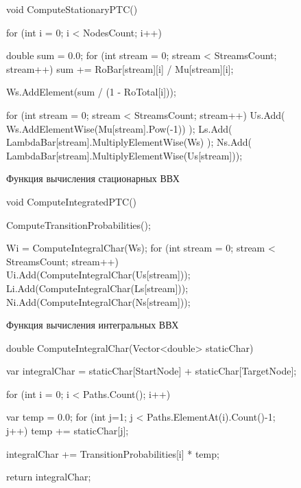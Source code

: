 \documentclass[oneside, draft, 14pt, a4paper]{extreport}
\begin{document}
\begin{figure}[h!]
	\begin{listing}{1}
void ComputeStationaryPTC()
{
  for (int i = 0; i < NodesCount; i++)
  {
	double sum = 0.0;
	for (int stream = 0; stream < StreamsCount; stream++)
	sum += RoBar[stream][i] / Mu[stream][i];

	Ws.AddElement(sum / (1 - RoTotal[i]));
  }

  for (int stream = 0; stream < StreamsCount; stream++)
  {
	Us.Add( Ws.AddElementWise(Mu[stream].Pow(-1)) );
	Ls.Add(
	  LambdaBar[stream].MultiplyElementWise(Ws) );
	Ns.Add(
	  LambdaBar[stream].MultiplyElementWise(Us[stream]));
  }
}\end{listing}

	\caption{Функция вычисления стационарных ВВХ}
	\label{pic:function_computeSPTC}
\end{figure}

\begin{figure}[h!]
	\begin{listing}{1}
void ComputeIntegratedPTC()
{
  ComputeTransitionProbabilities();

  Wi = ComputeIntegralChar(Ws);
  for (int stream = 0; stream < StreamsCount; stream++)
  {
	Ui.Add(ComputeIntegralChar(Us[stream]));
	Li.Add(ComputeIntegralChar(Ls[stream]));
	Ni.Add(ComputeIntegralChar(Ns[stream]));
  }
}\end{listing}

	\caption{Функция вычисления интегральных ВВХ}
	\label{pic:function_computeIPTC}
\end{figure}

\begin{figure}[h!]
	\begin{listing}{1}
double ComputeIntegralChar(Vector<double> staticChar)
{
  var integralChar =
	staticChar[StartNode] + staticChar[TargetNode];

  for (int i = 0; i < Paths.Count(); i++)
  {
	var temp = 0.0;
	for (int j=1; j < Paths.ElementAt(i).Count()-1; j++)
	  temp += staticChar[j];

	integralChar += TransitionProbabilities[i] * temp;
  }

  return integralChar;
}\end{listing}

	\caption{}
	\label{pic:function_computeIntegralChar}
\end{figure}
\end{document}
